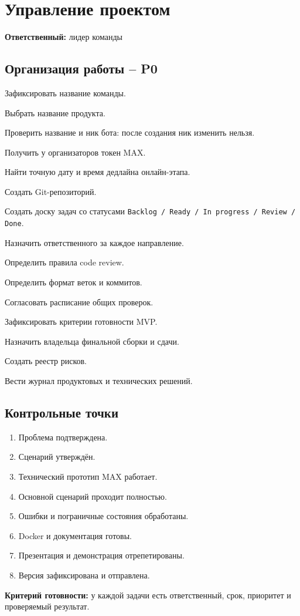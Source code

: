 \documentclass[11pt,a4paper]{article}
\newcommand{\PZero}{\textcolor{PZero}{\textbf{P0}}}
\newcommand{\done}[1]{\textbf{Критерий готовности:} #1}
\newcommand{\owner}[1]{\textcolor{Muted}{\textbf{Ответственный:} #1}}
\newcommand{\code}[1]{\texttt{#1}}
\begin{document}
\section{Управление проектом}
\owner{лидер команды}

\subsection{Организация работы -- \PZero}
\begin{tasklist}
  \item Зафиксировать название команды.
  \item Выбрать название продукта.
  \item Проверить название и ник бота: после создания ник изменить нельзя.
  \item Получить у организаторов токен MAX.
  \item Найти точную дату и время дедлайна онлайн-этапа.
  \item Создать Git-репозиторий.
  \item Создать доску задач со статусами \code{Backlog / Ready / In progress / Review / Done}.
  \item Назначить ответственного за каждое направление.
  \item Определить правила code review.
  \item Определить формат веток и коммитов.
  \item Согласовать расписание общих проверок.
  \item Зафиксировать критерии готовности MVP.
  \item Назначить владельца финальной сборки и сдачи.
  \item Создать реестр рисков.
  \item Вести журнал продуктовых и технических решений.
\end{tasklist}

\subsection{Контрольные точки}
\begin{enumerate}
  \item Проблема подтверждена.
  \item Сценарий утверждён.
  \item Технический прототип MAX работает.
  \item Основной сценарий проходит полностью.
  \item Ошибки и пограничные состояния обработаны.
  \item Docker и документация готовы.
  \item Презентация и демонстрация отрепетированы.
  \item Версия зафиксирована и отправлена.
\end{enumerate}
\done{у каждой задачи есть ответственный, срок, приоритет и проверяемый результат.}
\end{document}
